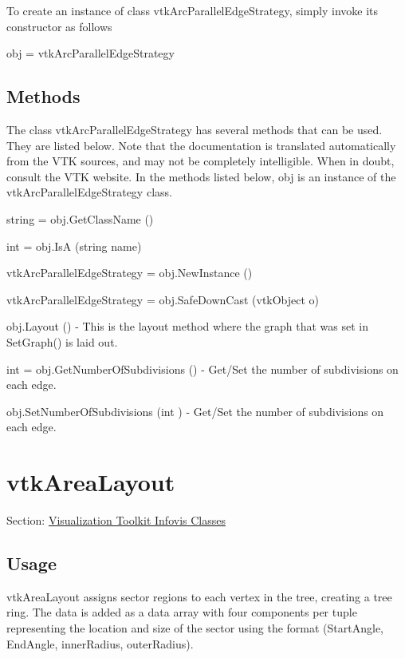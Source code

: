 To create an instance of class vtk\-Arc\-Parallel\-Edge\-Strategy, simply invoke its constructor as follows \begin{DoxyVerb}  obj = vtkArcParallelEdgeStrategy
\end{DoxyVerb}
 \hypertarget{vtkwidgets_vtkxyplotwidget_Methods}{}\subsection{Methods}\label{vtkwidgets_vtkxyplotwidget_Methods}
The class vtk\-Arc\-Parallel\-Edge\-Strategy has several methods that can be used. They are listed below. Note that the documentation is translated automatically from the V\-T\-K sources, and may not be completely intelligible. When in doubt, consult the V\-T\-K website. In the methods listed below, {\ttfamily obj} is an instance of the vtk\-Arc\-Parallel\-Edge\-Strategy class. 
\begin{DoxyItemize}
\item {\ttfamily string = obj.\-Get\-Class\-Name ()}  
\item {\ttfamily int = obj.\-Is\-A (string name)}  
\item {\ttfamily vtk\-Arc\-Parallel\-Edge\-Strategy = obj.\-New\-Instance ()}  
\item {\ttfamily vtk\-Arc\-Parallel\-Edge\-Strategy = obj.\-Safe\-Down\-Cast (vtk\-Object o)}  
\item {\ttfamily obj.\-Layout ()} -\/ This is the layout method where the graph that was set in Set\-Graph() is laid out.  
\item {\ttfamily int = obj.\-Get\-Number\-Of\-Subdivisions ()} -\/ Get/\-Set the number of subdivisions on each edge.  
\item {\ttfamily obj.\-Set\-Number\-Of\-Subdivisions (int )} -\/ Get/\-Set the number of subdivisions on each edge.  
\end{DoxyItemize}\hypertarget{vtkinfovis_vtkarealayout}{}\section{vtk\-Area\-Layout}\label{vtkinfovis_vtkarealayout}
Section\-: \hyperlink{sec_vtkinfovis}{Visualization Toolkit Infovis Classes} \hypertarget{vtkwidgets_vtkxyplotwidget_Usage}{}\subsection{Usage}\label{vtkwidgets_vtkxyplotwidget_Usage}
vtk\-Area\-Layout assigns sector regions to each vertex in the tree, creating a tree ring. The data is added as a data array with four components per tuple representing the location and size of the sector using the format (Start\-Angle, End\-Angle, inner\-Radius, outer\-Radius).

